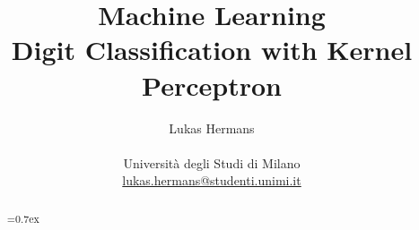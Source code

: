 \title{\large Machine Learning \\ \LARGE
 Digit Classification with Kernel Perceptron}
\author{Lukas Hermans\\ \\
{Università degli Studi di Milano} \\
\href{mailto:lukas.hermans@studenti.unimi.it}
{lukas.hermans@studenti.unimi.it}}

\maketitle

\begin{abstract} 
\noindent
{}\font=0.7ex%
\lipsum[1]
\end{abstract}
